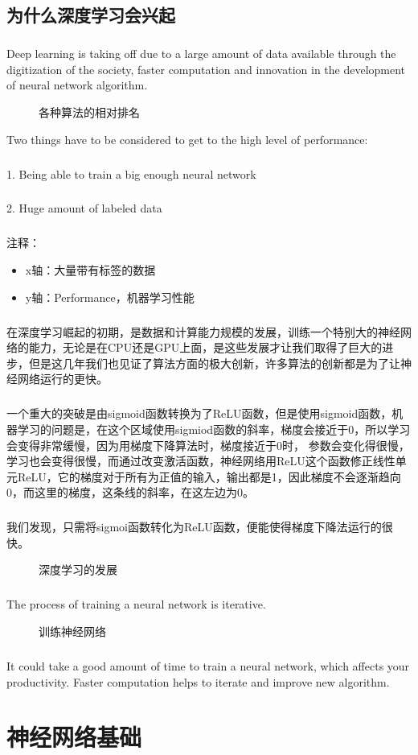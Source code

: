 \documentclass{article}
\begin{document}
\begin{CJK}{UTF8}{gbsn}
\subsection{为什么深度学习会兴起}
\subparagraph{}
Deep learning is taking off due to a large amount of data available through the digitization of the society,
faster computation and innovation in the development of neural network algorithm.
\begin{figure}[H]
\caption{各种算法的相对排名}
\label{fig:1107}
\end{figure}
Two things have to be considered to get to the high level of performance:
\subparagraph{}
1. Being able to train a big enough neural network
\subparagraph{}
2. Huge amount of labeled data
\subparagraph{}
注释：
\begin{itemize}
\item x轴：大量带有标签的数据
\item y轴：Performance，机器学习性能
\end{itemize}
\subparagraph{}
在深度学习崛起的初期，是数据和计算能力规模的发展，训练一个特别大的神经网络的能力，无论是在CPU还是GPU上面，是这些发展才让我们取得了巨大的进步，但是这几年我们也见证了算法方面的极大创新，许多算法的创新都是为了让神经网络运行的更快。
\subparagraph{}
一个重大的突破是由sigmoid函数转换为了ReLU函数，但是使用sigmoid函数，机器学习的问题是，在这个区域使用sigmiod函数的斜率，梯度会接近于0，所以学习会变得非常缓慢，因为用梯度下降算法时，梯度接近于0时， 参数会变化得很慢，学习也会变得很慢，而通过改变激活函数，神经网络用ReLU这个函数修正线性单元ReLU，它的梯度对于所有为正值的输入，输出都是1，因此梯度不会逐渐趋向0，而这里的梯度，这条线的斜率，在这左边为0。
\subparagraph{}
我们发现，只需将sigmoi函数转化为ReLU函数，便能使得梯度下降法运行的很快。  
\begin{figure}[H]
\caption{深度学习的发展}
\label{fig:1109}
\end{figure}
\subparagraph{}
The process of training a neural network is iterative.
\begin{figure}[H]
\caption{训练神经网络}
\label{fig:1110}
\end{figure}
\subparagraph{}
It could take a good amount of time to train a neural network, which affects your productivity. Faster computation helps to iterate and improve new algorithm.
\section{神经网络基础}

\end{CJK}
\end{document}
